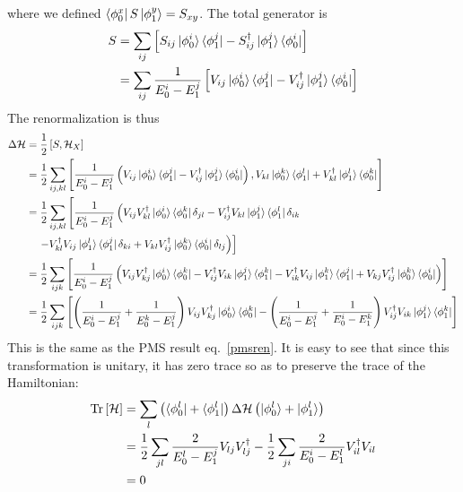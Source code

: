 \documentclass[twoside,11pt]{report}
\numberwithin{equation}{section}
\begin{document}
where we defined \(\bra{\phi_0^x}S\ket{\phi_1^y} = S_{xy}\). The total generator is
\begin{equation}\begin{aligned}
	\label{swtgen}
	S &= \sum_{ij}\left[S_{ij}\ket{\phi_0^i}\bra{\phi_1^j} - S_{ij}^\dagger\ket{\phi_1^j}\bra{\phi_0^i}\right]\\
	  &= \sum_{ij}\frac{1}{E_0^i - E_1^j}\left[V_{ij}\ket{\phi_0^i}\bra{\phi_1^j} - V^\dagger_{ij}\ket{\phi_1^j}\bra{\phi_0^i}\right]\\
\end{aligned}\end{equation}
The renormalization is thus
\begin{equation}\begin{aligned}
	\Delta \mathcal{H} &= \frac{1}{2} \left[S,\mathcal{H}_X\right]\\
			   &= \frac{1}{2} \sum_{ij,kl}\left[\frac{1}{E_0^i - E_1^j}\left(V_{ij}\ket{\phi_0^i}\bra{\phi_1^j} - V^\dagger_{ij}\ket{\phi_1^j}\bra{\phi_0^i}\right), V_{kl} \ket{\phi_0^k}\bra{\phi_1^l}+ V^\dagger_{kl} \ket{\phi_1^l}\bra{\phi_0^k}\right]\\
                  &= \frac{1}{2} \sum_{ij,kl}\left[\frac{1}{E_0^i - E_1^j}\left(V_{ij}V^\dagger_{kl}\ket{\phi_0^i}\bra{\phi_0^k}\delta_{jl} - V^\dagger_{ij}V_{kl}\ket{\phi_1^j}\bra{\phi_1^l}\delta_{ik}\right.\right.\\
                  &\quad\left.\left.- V^\dagger_{kl}V_{ij}\ket{\phi_1^l}\bra{\phi_1^j}\delta_{ki} + V_{kl}V^\dagger_{ij}\ket{\phi_0^k}\bra{\phi_0^i}\delta_{lj}\right)\right]\\
                  &= \frac{1}{2} \sum_{ijk}\left[\frac{1}{E_0^i - E_1^j}\left(V_{ij}V^\dagger_{kj}\ket{\phi_0^i}\bra{\phi_0^k} - V^\dagger_{ij}V_{ik}\ket{\phi_1^j}\bra{\phi_1^k}- V^\dagger_{ik}V_{ij}\ket{\phi_1^k}\bra{\phi_1^j} + V_{kj}V^\dagger_{ij}\ket{\phi_0^k}\bra{\phi_0^i}\right)\right]\\
		  &= \frac{1}{2} \sum_{ijk}\left[\left(\frac{1}{E_0^i - E_1^j} + \frac{1}{E_0^k - E_1^j}\right)V_{ij}V^\dagger_{kj}\ket{\phi_0^i}\bra{\phi_0^k} - \left(\frac{1}{E_0^i - E_1^j} + \frac{1}{E_0^i - E_1^k}\right)V^\dagger_{ij}V_{ik}\ket{\phi_1^j}\bra{\phi_1^k}\right]\\
\end{aligned}\end{equation}
This is the same as the PMS result eq.~\ref{pmsren}. It is easy to see that since this transformation is unitary, it has zero trace so as to preserve the trace of the Hamiltonian:
\begin{equation}\begin{aligned}
	\text{Tr}\left[\mathcal{H}\right] &= \sum_{l}\left(\bra{\phi_0^l} + \bra{\phi_1^l}\right)\Delta \mathcal{H}\left(\ket{\phi_0^l} + \ket{\phi_1^l}\right)\\
		&= \frac{1}{2} \sum_{jl}\frac{2}{E_0^l - E_1^j}V_{lj}V^\dagger_{lj} - \frac{1}{2} \sum_{ji}\frac{2}{E_0^i - E_1^l}V^\dagger_{il}V_{il}\\
		&= 0
\end{aligned}\end{equation}
\end{document}
